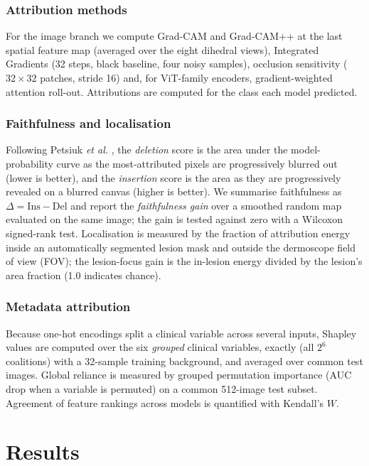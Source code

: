 \documentclass[journal]{IEEEtran}
\begin{document}
\subsubsection{Attribution methods}
For the image branch we compute Grad-CAM \cite{selvaraju2017} and Grad-CAM++ \cite{chattopadhay2018} at the last spatial feature map (averaged over the eight dihedral views), Integrated Gradients \cite{sundararajan2017} (32 steps, black baseline, four noisy samples), occlusion sensitivity \cite{zeiler2014} ($32\times32$ patches, stride 16) and, for ViT-family encoders, gradient-weighted attention roll-out. Attributions are computed for the class each model predicted.

\subsubsection{Faithfulness and localisation}
Following Petsiuk \textit{et al.} \cite{petsiuk2018}, the \emph{deletion} score is the area under the model-probability curve as the most-attributed pixels are progressively blurred out (lower is better), and the \emph{insertion} score is the area as they are progressively revealed on a blurred canvas (higher is better). We summarise faithfulness as $\Delta=\text{Ins}-\text{Del}$ and report the \emph{faithfulness gain} over a smoothed random map evaluated on the same image; the gain is tested against zero with a Wilcoxon signed-rank test. Localisation is measured by the fraction of attribution energy inside an automatically segmented lesion mask and outside the dermoscope field of view (FOV); the lesion-focus gain is the in-lesion energy divided by the lesion's area fraction (1.0 indicates chance).

\subsubsection{Metadata attribution}
Because one-hot encodings split a clinical variable across several inputs, Shapley values are computed over the six \emph{grouped} clinical variables, exactly (all $2^6$ coalitions) with a 32-sample training background, and averaged over common test images. Global reliance is measured by grouped permutation importance (AUC drop when a variable is permuted) on a common 512-image test subset. Agreement of feature rankings across models is quantified with Kendall's $W$.

\section{Results}
\end{document}
